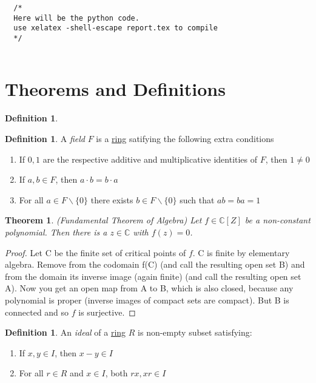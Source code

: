 \documentclass[10pt,a4paper]{article}
\theoremstyle{plain}
\newtheorem{theorem}[subsection]{Theorem}
\theoremstyle{definition}
\newtheorem{definition}[subsection]{Definition}
\theoremstyle{remark}
\begin{document}
\begin{verbatim}
  /*
  Here will be the python code.
  use xelatex -shell-escape report.tex to compile 
  */


\end{verbatim}
\section{Theorems and Definitions}
  \begin{definition} \label{dedekind} %

  \end{definition}

  \begin{definition} \label{field} %
    A \emph{field} $F$ is a \hyperref[ring]{ring} satifying the following extra conditions
    \begin{enumerate}
      \item If $0,1$ are the respective additive and multiplicative identities of $F$, then $1 \neq 0$
      \item If $a,b \in F$, then $a\cdot b = b \cdot a$ 
      \item For all $a \in F \backslash \lbrace 0 \rbrace $ there exists $b \in F \backslash \lbrace 0 \rbrace $ such that $ab = ba = 1$
    \end{enumerate}
  \end{definition}

  \begin{theorem} \label{fun} (\textit{Fundamental Theorem of Algebra})
    Let $f \in \mathbb{C}[Z]$ be a non-constant polynomial.  Then there is a $z\in\mathbb{C}$ with $f(z)=0$.
  \end{theorem}
  \begin{proof}
    Let C be the finite set of critical points of $f$. C is finite by elementary algebra. Remove from the codomain f(C) (and call the resulting open set B) and from the domain its inverse image (again finite) (and call the resulting open set A). Now you get an open map from A to B, which is also closed, because any polynomial is proper (inverse images of compact sets are compact). But B is connected and so $f$ is surjective.
  \end{proof}

  \begin{definition} \label{ideal} %
    An \emph{ideal} of a \hyperref[ring]{ring} $R$ is non-empty subset satisfying: 
    \begin{enumerate}
      \item If $x,y \in I$, then $x - y \in I$ 
      \item For all $r \in R$ and $x \in I$, both $rx,xr \in I$
    \end{enumerate}
  \end{definition}
\end{document}
